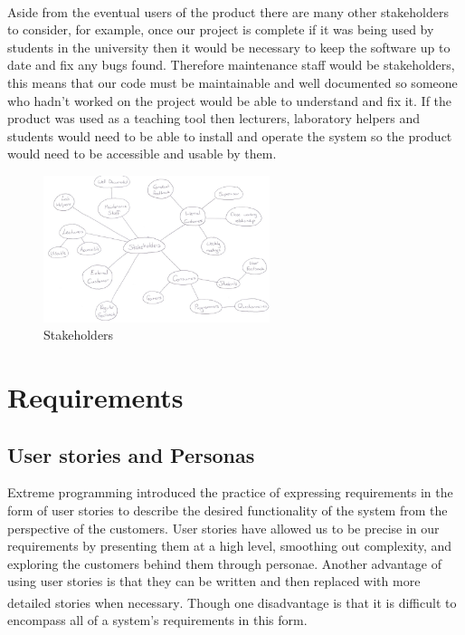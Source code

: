 \documentclass[10pt, a4paper]{article}
\begin{document}
Aside from the eventual users of the product there are many other stakeholders\textsuperscript{\cite{stakeholder}} to consider, for example, once our project is complete if it was being used by students in the university then it would be necessary to keep the software up to date and fix any bugs found. Therefore maintenance staff would be stakeholders, this means that our code must be maintainable and well documented so someone who hadn’t worked on the project would be able to understand and fix it. If the product was used as a teaching tool then lecturers, laboratory helpers and students would need to be able to install and operate the system so the product would need to be accessible and usable by them.

\begin{figure}[h]
        \centering
        \includegraphics[width=250px]{images/stakeholders.png}
        \caption{Stakeholders}
\end{figure}

\section{Requirements}

\subsection{User stories and Personas}

Extreme programming introduced the practice of expressing requirements in the form of user stories to describe the desired functionality of the system from the perspective of the customers. User stories have allowed us to be precise in our requirements by presenting them at a high level, smoothing out complexity, and exploring the customers behind them through personae.  Another advantage of using user stories is that they can be written and then replaced with more detailed stories when necessary\textsuperscript{\cite{mikeadv}}. Though one disadvantage is that it is difficult to encompass all of a system’s requirements in this form. 
\end{document}
